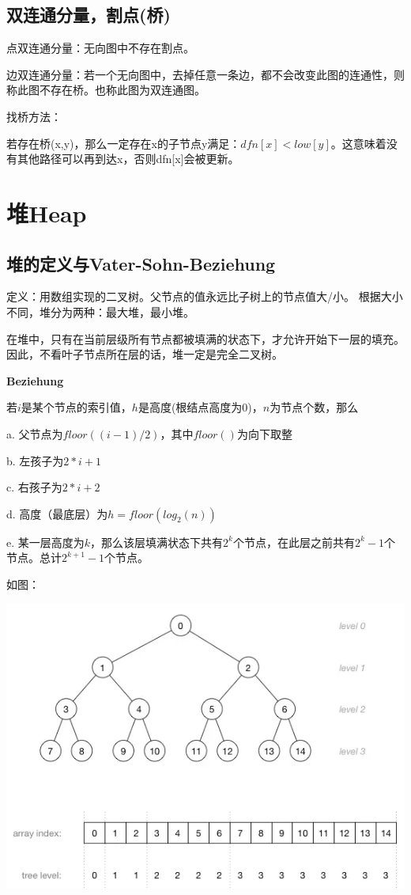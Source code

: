 \documentclass[a4paper]{article}    %
\begin{document}
\subsection{双连通分量，割点(桥)}

\noindent 点双连通分量：无向图中不存在割点。

\noindent 边双连通分量：若一个无向图中，去掉任意一条边，都不会改变此图的连通性，则称此图不存在桥。也称此图为双连通图。

\noindent 找桥方法：

若存在桥(x,y)，那么一定存在x的子节点y满足：$dfn[x]<low[y]$。这意味着没有其他路径可以再到达x，否则dfn[x]会被更新。

\section{堆Heap}

\subsection{堆的定义与Vater-Sohn-Beziehung}

定义：用数组实现的二叉树。父节点的值永远比子树上的节点值大/小。
根据大小不同，堆分为两种：最大堆，最小堆。

在堆中，只有在当前层级所有节点都被填满的状态下，才允许开始下一层的填充。因此，不看叶子节点所在层的话，堆一定是完全二叉树。

\textbf{Beziehung}

若$i$是某个节点的索引值，$h$是高度(根结点高度为0)，$n$为节点个数，那么

\indent\indent a. 父节点为$floor((i-1)/2)$，其中$floor()$为向下取整

\indent\indent b. 左孩子为$2*i + 1$ 

\indent\indent c. 右孩子为$2*i + 2$ 

\indent\indent d. 高度（最底层）为$h=floor(log_2(n))$

\indent\indent e. 某一层高度为$k$，那么该层填满状态下共有$2^k$个节点，在此层之前共有$2^k-1$个节点。总计$2^{k+1}-1$个节点。

如图：

\begin{center}
    \includegraphics[scale=0.6]{20.png}
\end{center}
\end{document}
